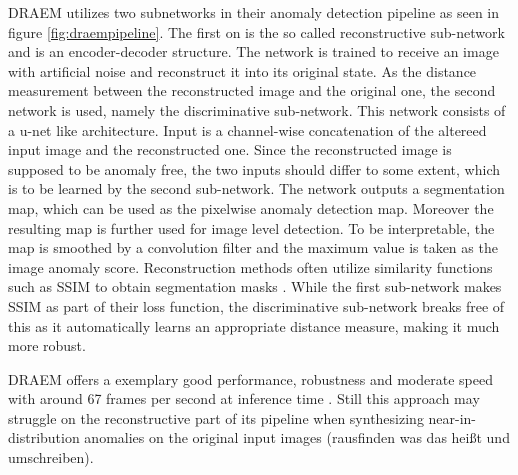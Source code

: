 DRAEM utilizes two subnetworks in their anomaly detection pipeline as seen in figure \ref{fig:draempipeline}. The first on is the so called reconstructive sub-network and is an encoder-decoder structure. The network is trained 
to receive an image with artificial noise and reconstruct it into its original state. As the distance measurement between the reconstructed image and the original one, the second network is used, 
namely the discriminative sub-network. This network consists of a u-net \cite{Ronneberger_2015UNET} like architecture. Input is a channel-wise concatenation of the altereed input image and the reconstructed 
one. Since the reconstructed image is supposed to be anomaly free, the two inputs should differ to some extent, which is to be learned by the second sub-network. The network outputs a segmentation map, 
which can be used as the pixelwise anomaly detection map. Moreover the resulting map is further used for image level detection. To be interpretable, the map is smoothed by a convolution filter 
and the maximum value is taken as the image anomaly score. Reconstruction methods often utilize similarity functions such as SSIM \cite{Wang_2004SSIM} to obtain segmentation masks \cite{Zavrtanik_2021DRAEM} 
\cite{liu2024deep}. While the first 
sub-network makes SSIM as part of their loss function, the discriminative sub-network breaks free of this as it automatically learns an appropriate distance measure, making it much more robust.

DRAEM offers a exemplary good performance, robustness and moderate speed with around 67 frames per second at inference time \cite{liu2023simplenet}. Still this approach may struggle on the reconstructive 
part of its pipeline when synthesizing near-in-distribution anomalies on the original input images \cite{liu2024deep} (rausfinden was das heißt und umschreiben).










